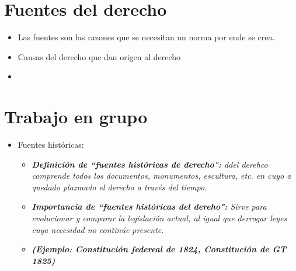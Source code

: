 \section{Fuentes del derecho}
\begin{itemize}
    \item Las fuentes son las razones que se necesitan un norma por ende se crea.
    \item Causas del derecho que dan origen al derecho
    \item 
\end{itemize}

\section{Trabajo en grupo}
\begin{itemize}
    \item Fuentes históricas:
    \begin{itemize}
        \item \emph{\textbf{Definición de ``fuentes históricas de derecho":} ddel derehco comprende todos los documentos, monumentos, escultura, etc. en cuyo a quedado plazmado el derecho a través del tiempo.}
        \item \emph{\textbf{Importancia de ``fuentes históricas del dereho":} Sirve para evolucionar y comparar la legislación actual, al igual que derrogar leyes cuya necesidad no continúe presente.}
        \item \textbf{\emph{(Ejemplo: Constitución federeal de 1824, Constitución de GT 1825)}}
    \end{itemize}
    

\end{itemize}
